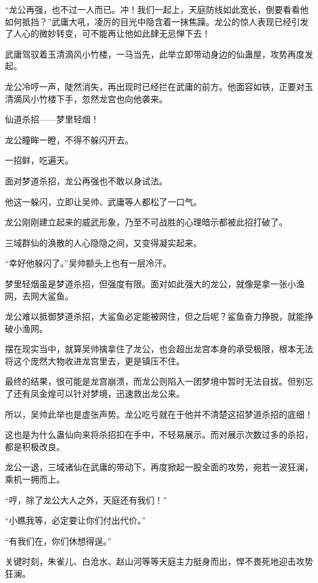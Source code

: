 
\begin{this_body}

“龙公再强，也不过一人而已。冲！我们一起上，天庭防线如此宽长，倒要看看他如何抵挡？”武庸大吼，凌厉的目光中隐含着一抹焦躁。龙公的惊人表现已经引发了人心的微妙转变，可不能再让他如此肆无忌惮下去！

武庸驾驭着玉清滴风小竹楼，一马当先，此举立即带动身边的仙蛊屋，攻势再度发起。

龙公冷哼一声，陡然消失，再出现时已经拦在武庸的前方。他面容如铁，正要对玉清滴风小竹楼下手，忽然龙宫也向他袭来。

仙道杀招——梦里轻烟！

龙公瞳眸一瞪，不得不躲闪开去。

一招鲜，吃遍天。

面对梦道杀招，龙公再强也不敢以身试法。

他这一躲闪，立即让吴帅、武庸等人都松了一口气。

龙公刚刚建立起来的威武形象，乃至不可战胜的心理暗示都被此招打破了。

三域群仙的涣散的人心隐隐之间，又变得凝实起来。

“幸好他躲闪了。”吴帅额头上也有一层冷汗。

梦里轻烟虽是梦道杀招，但强度有限。面对如此强大的龙公，就像是拿一张小渔网，去网大鲨鱼。

龙公难以抵御梦道杀招，大鲨鱼必定能被网住，但之后呢？鲨鱼奋力挣脱，就能挣破小渔网。

摆在现实当中，就算吴帅擒拿住了龙公，也会超出龙宫本身的承受极限，根本无法将这个庞然大物收进龙宫里去，更是镇压不住。

最终的结果，很可能是龙宫崩溃，而龙公则陷入一团梦境中暂时无法自拔。但别忘了还有凤金煌可以针对梦境，迅速救出龙公来。

所以，吴帅此举也是虚张声势。龙公吃亏就在于他并不清楚这招梦道杀招的底细！

这也是为什么蛊仙向来将杀招扣在手中，不轻易展示。而对展示次数过多的杀招，都是积极改良。

龙公一退，三域诸仙在武庸的带动下，再度掀起一股全面的攻势，宛若一波狂澜，乘机一拥而上。

“哼，除了龙公大人之外，天庭还有我们！”

“小瞧我等，必定要让你们付出代价。”

“有我们在，你们休想得逞。”

关键时刻，朱雀儿、白沧水、赵山河等等天庭主力挺身而出，悍不畏死地迎击攻势狂澜。


\end{this_body}
